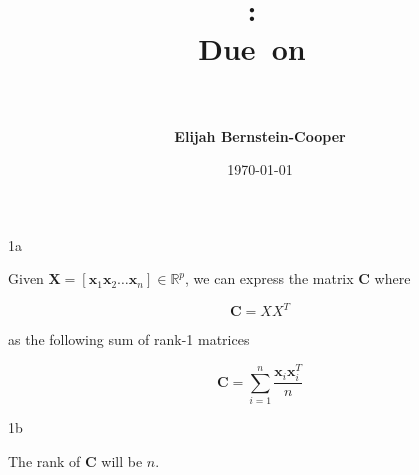 \documentclass{article}
\title{\vspace{0in}
    \textmd{\textbf{\hmwkClass:\ \hmwkTitle}}\\
    \normalsize\vspace{0.1in}\small{Due\ on\ \hmwkDueDate}\\
    \vspace{0.1in}\large{\textit{\hmwkClassInstructor\ \hmwkClassTime}}
    \vspace{0.5in}}
\author{\textbf{Elijah Bernstein-Cooper}}
\date{\today} %
\begin{document}
\maketitle

\begin{homeworkProblem}

    \begin{homeworkSection}{1a}

        Given $\bm{X} = [{\bm x}_1 {\bm x}_2 \dots {\bm x}_n] \in
        \mathbb{R}^p$, we can express the matrix $\bm{C}$ where

        \begin{equation}  
            {\bm C = XX}^T
        \end{equation}

        \noindent as the following sum of rank-1 matrices

        \begin{equation}
            {\bm C} = \sum_{i = 1}^{n} \frac{\bm{x}_i \bm{x}_i^T}{n}
        \end{equation}

    \end{homeworkSection}

    \begin{homeworkSection}{1b}
        
        The rank of $\bm{C}$ will be $n$.

    \end{homeworkSection}

\end{homeworkProblem}
\end{document}
